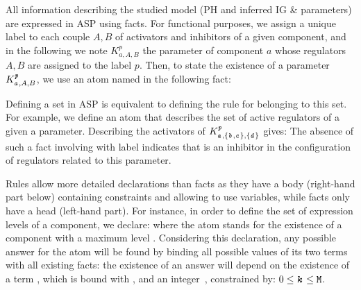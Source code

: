 All information describing the studied model (PH and inferred IG \& parameters) are expressed in ASP using facts.
For functional purposes, we assign a unique label to each couple $A,B$ of activators and inhibitors of a given component, and in the following we note $K^p_{a,A,B}$ the parameter of component $a$ whose regulators $A,B$ are assigned to the label $p$.
Then, to state the existence of a parameter $K^{\texttt{\textit{p}}}_{\texttt{\textit{a}},A,B}$, we use an atom named  in the following fact:

Defining a set in ASP is equivalent to defining the rule for belonging to this set.
For example, we define an atom  that describes the set of active regulators of a given a parameter.
Describing the activators of $K^{\texttt{\textit{p}}}_{\texttt{\textit{a}},\{\texttt{\textit{b}},\texttt{\textit{c}}\},\{\texttt{\textit{d}}\}}$ gives:
The absence of such a fact involving  with label  indicates that  is an inhibitor in the configuration of regulators related to this parameter.

Rules allow more detailed declarations than facts as they have a body (right-hand part below) containing constraints and allowing to use variables, while facts only have a head (left-hand part).
For instance, in order to define the set of expression levels of a component, we declare:
where the  atom stands for the existence of a component  with a maximum level .
Considering this declaration, any possible answer for the atom  will be found by binding all possible values of its two terms with all existing  facts: the existence of an answer  will depend on the existence of a term , which is bound with , and an integer~, constrained by: $0 \leq \texttt{\textit{k}} \leq \texttt{M}$.

